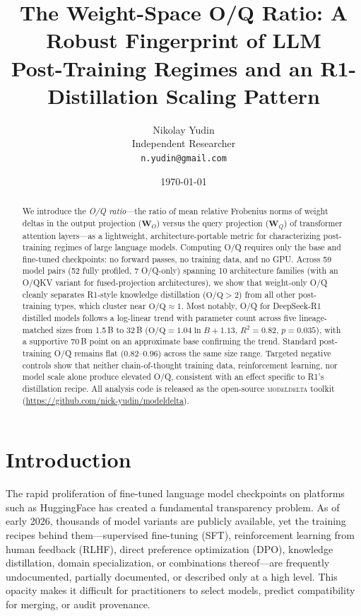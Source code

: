\documentclass[11pt]{article}
\title{The Weight-Space O/Q Ratio: A Robust Fingerprint of LLM \\
Post-Training Regimes and an R1-Distillation Scaling Pattern}
\author{
Nikolay Yudin \\
Independent Researcher \\
\texttt{n.yudin@gmail.com}
}
\date{\today}
\newcommand{\oq}{\text{O/Q}}
\newcommand{\modeldelta}{\textsc{modeldelta}}
\begin{document}
\maketitle

\begin{abstract}

We introduce the \emph{O/Q ratio}---the ratio of mean relative Frobenius norms
of weight deltas in the output projection ($\mathbf{W}_O$) versus the query
projection ($\mathbf{W}_Q$) of transformer attention layers---as a lightweight,
architecture-portable metric for characterizing post-training regimes of large
language models.
Computing O/Q requires only the base and fine-tuned checkpoints: no forward
passes, no training data, and no GPU.
Across 59 model pairs (52 fully profiled, 7 O/Q-only) spanning 10
architecture families (with an O/QKV variant for fused-projection
architectures), we show that weight-only O/Q cleanly separates R1-style
knowledge distillation ($\oq > 2$) from all other post-training types,
which cluster near $\oq \approx 1$.
Most notably, O/Q for DeepSeek-R1 distilled models follows a log-linear
trend with parameter count across five lineage-matched sizes from 1.5\,B to 32\,B
($\oq = 1.04 \ln B + 1.13$, $R^2{=}0.82$, $p{=}0.035$), with a supportive
70\,B point on an approximate base confirming the trend.
Standard post-training O/Q remains flat ($0.82$--$0.96$) across the same size
range.
Targeted negative controls show that neither chain-of-thought training data,
reinforcement learning, nor model scale alone produce elevated O/Q, consistent
with an effect specific to R1's distillation recipe.
All analysis code is released as the open-source \modeldelta{} toolkit
(\url{https://github.com/nick-yudin/modeldelta}).

\end{abstract}


\section{Introduction}

The rapid proliferation of fine-tuned language model checkpoints on platforms
such as HuggingFace has created a fundamental transparency problem.
As of early 2026, thousands of model variants are publicly available, yet
the training recipes behind them---supervised fine-tuning (SFT), reinforcement
learning from human feedback (RLHF), direct preference optimization (DPO),
knowledge distillation, domain specialization, or combinations thereof---are
frequently undocumented, partially documented, or described only at a high
level.
This opacity makes it difficult for practitioners to select models, predict
compatibility for merging, or audit provenance.
\end{document}
